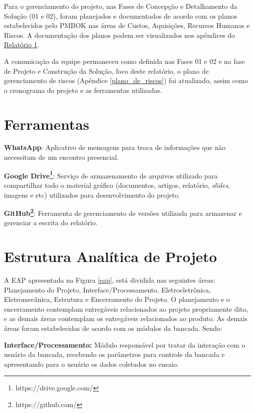 Para o gerenciamento do projeto, nas Fases de Concepção e Detalhamento da Solução (01 e 02), foram planejados e documentados de acordo com os planos estabelecidos pelo PMBOK \cite{pmbok} nas 
áreas de Custos, Aquisições, Recursos Humanos e Riscos. A documentação dos planos podem ser visualizados nos apêndices do 
\href{https://drive.google.com/file/d/0B5InkGKx6O-MR1B3eVYzZFpjQ3c/view?usp=sharing}{Relatório 1}. 

A comunicação da equipe permaneceu como definida nas Fases 01 e 02 e na fase de Projeto e Construção da Solução, foco deste relatório, o plano de gerenciamento de riscos 
(Apêndice \ref{plano_de_riscos}) foi atualizado, assim como o cronograma do projeto e as ferramentas utilizadas. 

\section*{Ferramentas}

\textbf{WhatsApp}:
Aplicativo de mensagens para troca de informações que não necessitam de um encontro presencial.

\textbf{Google Drive\footnote{https://drive.google.com/}}: Serviço de armazenamento de arquivos utilizado para compartilhar todo o material gráfico (documentos, artigos, relatório, \textit{slides}, imagens e etc) utilizados para desenvolvimento do projeto.

\textbf{GitHub\footnote{https://github.com/}}: Ferramenta de gerenciamento de versões utilizada para armazenar e gerenciar 
a escrita do relatório.

\section*{Estrutura Analítica de Projeto}

A EAP apresentada na Figura \ref{eap}, está dividida nas seguintes áreas: Planejamento do Projeto, Interface/Processamento, Eletroeletrônica, Eletromecânica, Estrutura e Encerramento do Projeto. O planejamento e o encerramento contemplam entregáveis relacionados ao projeto propriamente dito, e as demais áreas contemplam os entregáveis relacionados ao produto. As demais áreas foram estabelecidas de acordo com os módulos da bancada. Sendo:

\textbf{Interface/Processamento:} Módulo responsável por tratar da interação com o usuário da bancada, recebendo os parâmetros para controle da bancada e apresentando para o usuário os dados coletados no ensaio.

